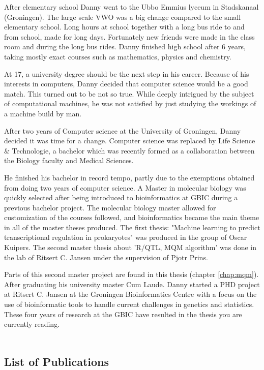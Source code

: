 After elementary school Danny went to the Ubbo Emmius lyceum in Stadskanaal (Groningen). 
The large scale VWO was a big change compared to the small elementary school. Long hours at school 
together with a long bus ride to and from school, made for long days. Fortunately new 
friends were made in the class room and during the long bus rides. Danny finished high 
school after 6 years, taking mostly exact courses such as mathematics, physics and chemistry.

At 17, a university degree should be the next step in his career. Because of his interests 
in computers, Danny decided that computer science would be a good match. This turned out 
to be not so true. While deeply intrigued by the subject of computational machines, he 
was not satisfied by just studying the workings of a machine build by man.

After two years of Computer science at the University of Groningen, Danny decided it was time 
for a change. Computer science was replaced by Life Science \& Technologie, a bachelor which 
was recently formed as a collaboration between the Biology faculty and Medical Sciences.

He finished his bachelor in record tempo, partly due to the exemptions obtained from 
doing two years of computer science. A Master in molecular biology was quickly selected after
being introduced to bioinformatics at GBIC during a previous bachelor project. The molecular 
biology master allowed for customization of the courses followed, and bioinformatics became the main 
theme in all of the master theses produced. The first thesis: "Machine learning to predict 
transcriptional regulation in prokaryotes" was produced in the group of Oscar Kuipers. 
The second master thesis about 'R/QTL, MQM algorithm' was done in the lab of Ritsert C. Jansen 
under the supervision of Pjotr Prins.

Parts of this second master project are found in this thesis (chapter \ref{chap:mqm}).
After graduating his university master Cum Laude. Danny started a PHD project at Ritsert 
C. Jansen at the Groningen Bioinformatics Centre with a focus on the use of bioinformatic 
tools to handle current challenges in genetics and statistics. These four years of research 
at the GBIC have resulted in the thesis you are currently reading.\\\\

\newpage

\subsection{List of Publications}

